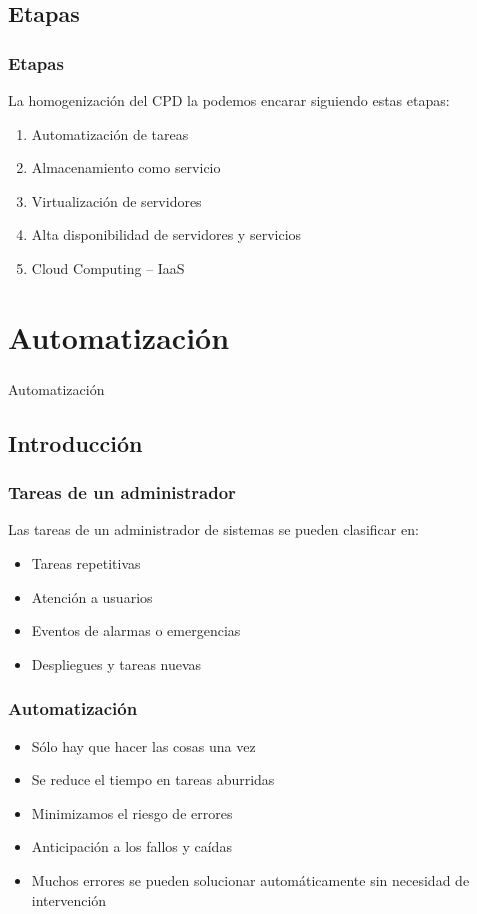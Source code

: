\documentclass{beamer}
\begin{document}
\subsection{Etapas}
\begin{frame}
  \frametitle{Etapas}
  La homogenización del CPD la podemos encarar siguiendo estas etapas:
  \begin{enumerate}
    \item Automatización de tareas
    \pause
    \item Almacenamiento como servicio
    \pause
    \item Virtualización de servidores
    \pause
    \item Alta disponibilidad de servidores y servicios
    \pause
    \item Cloud Computing -- IaaS
  \end{enumerate}
\end{frame}


\section{Automatización}
\begin{frame}
  \frametitle{}
  \begin{center}
    \Huge Automatización
  \end{center}
\end{frame}

\subsection{Introducción}
\begin{frame}
  \frametitle{Tareas de un administrador}
  Las tareas de un administrador de sistemas se pueden clasificar en:
  \begin{itemize}
    \item Tareas repetitivas
    \item Atención a usuarios
    \item Eventos de alarmas o emergencias
    \item Despliegues y tareas nuevas
  \end{itemize}
\end{frame}

\begin{frame}
  \frametitle{Automatización}
  \begin{itemize}
    \item Sólo hay que hacer las cosas una vez
    \item Se reduce el tiempo en tareas aburridas
    \item Minimizamos el riesgo de errores
    \item Anticipación a los fallos y caídas
    \item Muchos errores se pueden solucionar automáticamente sin necesidad de intervención
  \end{itemize}
\end{frame}
\end{document}
